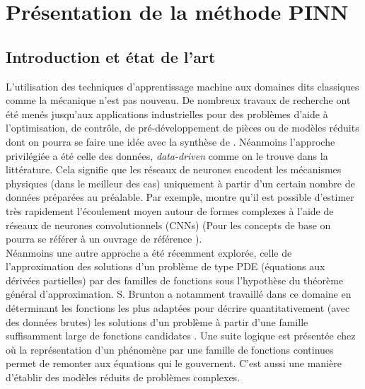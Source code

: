 \section{Présentation de la méthode PINN}

\subsection{Introduction et état de l'art}

L'utilisation des techniques d'apprentissage machine aux domaines dits \og classiques \fg{} comme la mécanique n'est pas nouveau. De nombreux travaux de recherche ont été menés jusqu'aux applications industrielles pour des problèmes d'aide à l'optimisation, de contrôle, de pré-développement de pièces ou de modèles réduits dont on pourra se faire une idée avec la synthèse de \cite{bruntonMachineLearningFluid2019a}. Néanmoins l'approche privilégiée a été celle des données, \textit{data-driven} comme on le trouve dans la littérature. Cela signifie que les réseaux de neurones encodent les mécanismes physiques (dans le meilleur des cas) uniquement à partir d'un certain nombre de données préparées au préalable. Par exemple,  \cite{guoConvolutionalNeuralNetworks2016} montre qu'il est possible d'estimer très rapidement l'écoulement moyen autour de formes complexes à l'aide de réseaux de neurones convolutionnels (CNNs) (Pour les concepts de base on pourra se référer à un ouvrage de référence \cite{goodfellowDeepLearning2016a}). \\

Néanmoins une autre approche a été récemment explorée, celle de l'approximation des solutions d'un problème de type PDE (équations aux dérivées partielles) par des familles de fonctions sous l'hypothèse du théorème général d'approximation. S. Brunton a notamment travaillé dans ce domaine en déterminant les fonctions les plus adaptées pour décrire quantitativement (avec des données brutes) les solutions d'un problème à partir d'une famille suffisamment large de fonctions candidates \cite{bruntonDiscoveringGoverningEquations2016}. Une suite logique est présentée chez \cite{corbettaApplicationSparseIdentification} où la représentation d'un phénomène par une famille de fonctions continues permet de remonter aux équations qui le gouvernent. C'est aussi une manière d'établir des modèles réduits de problèmes complexes. \\

